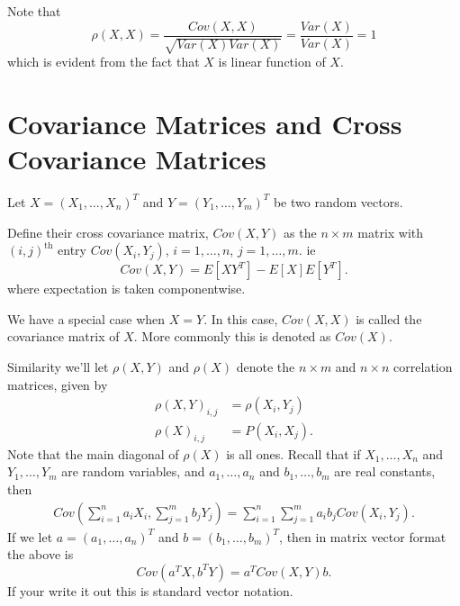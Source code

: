Note that 
 \[
	 \rho\left( X,X \right) = \frac{Cov\left( X, X \right) }{\sqrt{Var\left( X \right) Var\left( X \right) } } = \frac{Var\left( X \right) }{Var\left( X \right) } = 1
\] 
which is evident from the fact that $X$ is linear function of $X$. 

\section{Covariance Matrices and Cross Covariance Matrices}

Let $X = \left( X_{1} , \ldots , X_{n} \right) ^{T}$ and $Y = \left( Y_{1} , \ldots , Y_{m} \right) ^{T}$ be two random vectors. 

Define their cross covariance matrix, $Cov\left( X, Y \right) $ as the $n \times  m$ matrix with $\left( i, j \right) ^{\text{th}}$ entry $Cov\left( X_i , Y_j \right) $, $i = 1 , \ldots , n$, $j = 1, \ldots , m$. ie 
\[
	Cov\left( X, Y \right)  = E\left[ XY^{T} \right]  - E\left[ X \right] E\left[ Y^{T} \right] 
.\] 
where expectation is taken componentwise.

We have a special case when $X = Y$. In this case, $Cov\left( X, X \right) $ is called the covariance matrix of $X$. More commonly this is denoted as $Cov\left( X \right) $. 

Similarity we'll let $\rho\left( X, Y \right) $ and $\rho\left( X \right) $ denote the $n \times m$ and $n \times n$ correlation matrices, given by 
\begin{align*}
	\rho\left( X, Y \right) _{i, j} &= \rho\left( X_i , Y_j  \right)  \\
	\rho\left( X \right) _{i, j} &=  P\left( X_i , X_j \right) 
.\end{align*}
Note that the main diagonal of $\rho \left( X \right) $ is all ones.
Recall that if $X_{1} , \ldots , X_{n}$ and $Y_{1} , \ldots , Y_{m}$ are random variables, and $a_{1} , \ldots , a_{n}$ and $b_{1} , \ldots , b_{m}$ are real constants, then 
\begin{align*}
	Cov\left( \sum_{i=1}^{n} a_i X_i , \sum_{j=1}^{m} b_j Y_j \right) = \sum_{i=1}^{n } \sum_{j=1}^{m} a_i b_j Cov\left( X_i , Y_j  \right) 
.\end{align*}
If we let $a = \left( a_{1} , \ldots , a_{n} \right) ^{T}$ and $b = \left( b_{1} , \ldots , b_{m} \right) ^{T}$, then in matrix vector format the above is 
\[
	Cov\left( a^{T}X, b^{T}Y \right) = a^{T}Cov\left( X, Y \right) b
.\]
If your write it out this is standard vector notation.

